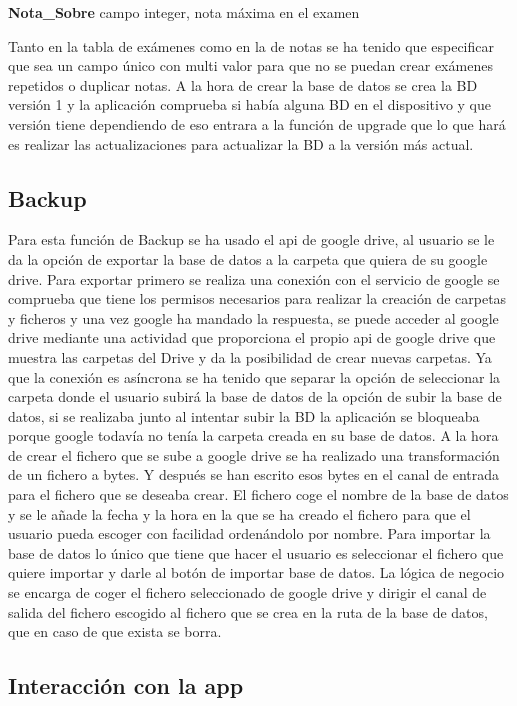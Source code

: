 \textbf{Nota\_Sobre} campo integer, nota máxima en el examen


Tanto en la tabla de exámenes como en la de notas se ha tenido que especificar que sea un campo único con multi valor para que no se puedan crear exámenes repetidos o duplicar notas.
A la hora de crear la base de datos se crea la BD versión 1 y la aplicación comprueba si había alguna BD en el dispositivo y que versión tiene dependiendo de eso entrara a la función de upgrade que lo que hará es realizar las actualizaciones para actualizar la BD a la versión más actual.

\subsection{Backup}
\label{subsecc:Backup}

Para esta función de Backup se ha usado el api de google drive, al usuario se le da la opción de exportar la base de datos a la carpeta que quiera de su google drive.
Para exportar primero se realiza una conexión con el servicio de google se comprueba que tiene los permisos necesarios para realizar la creación de carpetas y ficheros y una vez google ha mandado la respuesta, se puede acceder al google drive mediante una actividad que proporciona el propio api de google drive que muestra las carpetas del Drive y da la posibilidad de crear nuevas carpetas. 
Ya que la conexión es  asíncrona se ha tenido que separar la opción de seleccionar la carpeta donde el usuario subirá la base de datos de la opción de subir la base de datos,  si se realizaba junto al intentar subir la BD la aplicación se bloqueaba porque google todavía no tenía la carpeta creada en su base de datos. 
A la hora de crear el fichero que se sube a google drive se ha realizado una transformación de un fichero a bytes.
Y después se han escrito esos bytes en el canal de entrada para el fichero que se deseaba crear.
El fichero coge el nombre de la base de datos y se le añade la fecha y la hora en la que se ha creado el fichero para que el usuario pueda escoger con facilidad ordenándolo por nombre.
Para importar la base de datos lo único que tiene que hacer el usuario es seleccionar el fichero que quiere importar y darle al botón de importar base de datos.
La lógica de negocio se encarga de coger el fichero seleccionado de google drive y dirigir el canal de salida del fichero escogido al fichero que se crea en la ruta de la base de datos, que en caso de que exista se borra.

\subsection{Interacción con la app}
\label{subsecc:Interacción con la app}

